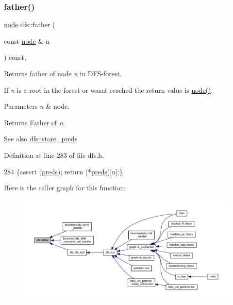 \subsubsection{\texorpdfstring{father()}{father()}}
{\footnotesize\ttfamily \mbox{\hyperlink{classnode}{node}} dfs\+::father (\begin{DoxyParamCaption}\item[{const \mbox{\hyperlink{classnode}{node}} \&}]{n }\end{DoxyParamCaption}) const\hspace{0.3cm}{\ttfamily [inline]}, {\ttfamily [inherited]}}



Returns father of node {\itshape n} in D\+F\+S-\/forest. 

If {\itshape n} is a root in the forest or wasn\textquotesingle{}t reached the return value is {\ttfamily \mbox{\hyperlink{classnode}{node()}}}.


\begin{DoxyParams}{Parameters}
{\em n} & node. \\
\hline
\end{DoxyParams}
\begin{DoxyReturn}{Returns}
Father of {\itshape n}. 
\end{DoxyReturn}
\begin{DoxySeeAlso}{See also}
\mbox{\hyperlink{classdfs_a7043f46eb3887cbcbb1391fc783407a4}{dfs\+::store\+\_\+preds}} 
\end{DoxySeeAlso}


Definition at line 283 of file dfs.\+h.


\begin{DoxyCode}
284     \{assert (\mbox{\hyperlink{classdfs_a3fdeb5a211a1bc1753b2a637258c5355}{preds}}); \textcolor{keywordflow}{return} (*\mbox{\hyperlink{classdfs_a3fdeb5a211a1bc1753b2a637258c5355}{preds}})[n];\}
\end{DoxyCode}
Here is the caller graph for this function\+:
\nopagebreak
\begin{figure}[H]
\begin{center}
\leavevmode
\includegraphics[width=350pt]{classdfs_a3012717ce541b3e56943e2c2c50efdf6_icgraph}
\end{center}
\end{figure}
\mbox{\label{classdfs_aae46a50d0c73c63bf72e483668fd22a2}} 
